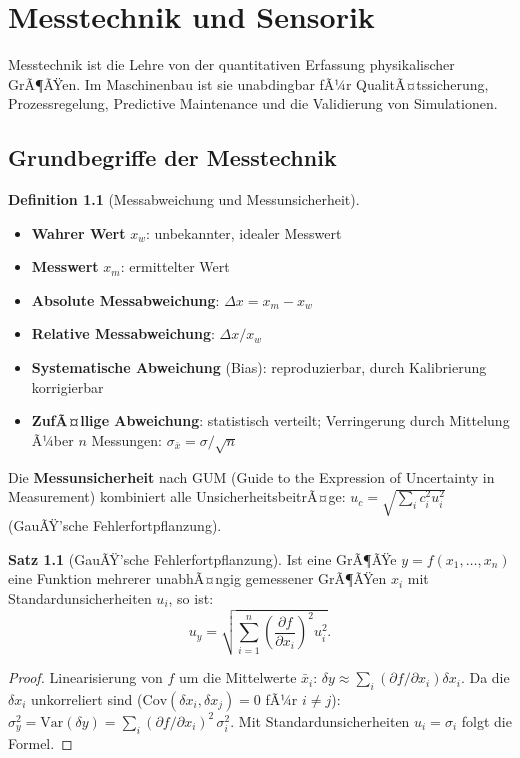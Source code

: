 ﻿\documentclass[a4paper,12pt]{report}
\theoremstyle{definition}
\newtheorem{definition}{Definition}
\newtheorem{satz}{Satz}
\begin{document}
\chapter{Messtechnik und Sensorik}

Messtechnik ist die Lehre von der quantitativen Erfassung physikalischer
GrÃ¶ÃŸen. Im Maschinenbau ist sie unabdingbar fÃ¼r QualitÃ¤tssicherung,
Prozessregelung, Predictive Maintenance und die Validierung von Simulationen.

\section{Grundbegriffe der Messtechnik}

\begin{definition}[Messabweichung und Messunsicherheit]
\begin{itemize}
    \item[-] \textbf{Wahrer Wert} $x_w$: unbekannter, idealer Messwert
    \item[-] \textbf{Messwert} $x_m$: ermittelter Wert
    \item[-] \textbf{Absolute Messabweichung}: $\Delta x = x_m - x_w$
    \item[-] \textbf{Relative Messabweichung}: $\Delta x / x_w$
    \item[-] \textbf{Systematische Abweichung} (Bias): reproduzierbar,
          durch Kalibrierung korrigierbar
    \item[-] \textbf{ZufÃ¤llige Abweichung}: statistisch verteilt;
          Verringerung durch Mittelung Ã¼ber $n$ Messungen: $\sigma_{\bar{x}} = \sigma/\sqrt{n}$
\end{itemize}
Die \textbf{Messunsicherheit} nach GUM (Guide to the Expression of Uncertainty in Measurement)
kombiniert alle UnsicherheitsbeitrÃ¤ge:
$u_c = \sqrt{\sum_i c_i^2 u_i^2}$ (GauÃŸ'sche Fehlerfortpflanzung).
\end{definition}

\begin{satz}[GauÃŸ'sche Fehlerfortpflanzung]
Ist eine GrÃ¶ÃŸe $y = f(x_1, \ldots, x_n)$ eine Funktion mehrerer unabhÃ¤ngig
gemessener GrÃ¶ÃŸen $x_i$ mit Standardunsicherheiten $u_i$, so ist:
\[
  u_y = \sqrt{\sum_{i=1}^n \left(\frac{\partial f}{\partial x_i}\right)^2 u_i^2}.
\]
\end{satz}
\begin{proof}
Linearisierung von $f$ um die Mittelwerte $\bar{x}_i$:
$\delta y \approx \sum_i (\partial f/\partial x_i)\delta x_i$.
Da die $\delta x_i$ unkorreliert sind ($\mathrm{Cov}(\delta x_i, \delta x_j) = 0$ fÃ¼r $i\neq j$):
$\sigma_y^2 = \mathrm{Var}(\delta y) = \sum_i (\partial f/\partial x_i)^2\,\sigma_i^2$.
Mit Standardunsicherheiten $u_i = \sigma_i$ folgt die Formel.
\end{proof}
\end{document}

